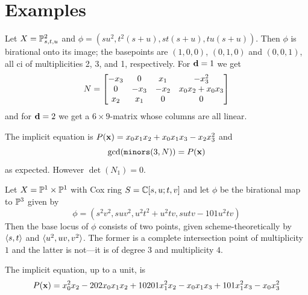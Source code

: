 \documentclass[]{beamer}
\begin{document}
\section{Examples}

\begin{frame}
\begin{example}
Let $X=\mathbb{P}^2_{s,t,u}$ and $\phi=(su^2,t^2(s+u),st(s+u),tu(s+u))$. Then $\phi$ is birational onto its
image; the basepoints are $(1,0,0)$, $(0,1,0)$ and $(0,0,1)$,
all ci of multiplicities 2, 3, and 1, respectively. For $\mathbf d=1$ we get
\[
N=\bgroup\begin{bmatrix}{-{x}_{3}}&
0&
{x}_{1}&
{-{x}_{3}^{2}}\\
0&
{-{x}_{3}}&
{-{x}_{2}}&
{x}_{0} {x}_{2}+{x}_{0} {x}_{3}\\
{x}_{2}&
{x}_{1}&
0&
0\\
\end{bmatrix}\egroup
\]
and for $\mathbf d=2$ we get a $6\times 9$-matrix whose columns are all linear.

The implicit equation is $P(\mathbf x)=x_0x_1x_2+x_0x_1x_3-x_2x_3^2$ and
\[
	\gcd(\mathop{\tt minors}(3,N))=P(\mathbf x)
\]
as expected. However $\det(N_1)=0$.
\end{example}
\end{frame}

\begin{frame}
\begin{example}
	Let $X=\mathbb{P}^1\times\mathbb{P}^1$ with Cox ring $S=\mathbb{C}[s,u;t,v]$
	and let $\phi$ be the birational map to $\mathbb{P}^3$ given by
	\[
		\phi=(s^{2} v^{2},s u v^{2},u^{2} t^{2}+u^{2} t v,s u t v-101 u^{2}t v)
	\]
	Then the base locus of $\phi$ consists of two points, given scheme-theoretically
	by $\langle s,t\rangle$ and $\langle u^2,uv,v^2\rangle$.
	The former is a complete intersection point of multiplicity $1$
	and the latter is not---it is of degree $3$ and multiplicity $4$.
	
	The implicit equation, up to a unit, is
	\[
		P(\mathbf x)={x}_{0}^{2} {x}_{2}-202 {x}_{0} {x}_{1} {x}_{2}+10201
		{x}_{1}^{2} {x}_{2}-{x}_{0} {x}_{1} {x}_{3}+101 {x}_{1}^{2} {x}_{3}-{x}_{0}
		{x}_{3}^{2}
	\]
\end{example}
\end{frame}
\end{document}

